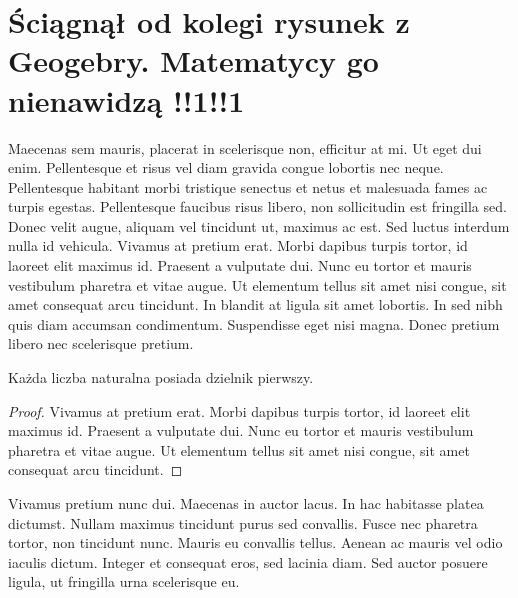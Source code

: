 \section{Ściągnął od kolegi rysunek z Geogebry. Matematycy go nienawidzą !!1!!1}
Maecenas sem mauris, placerat in scelerisque non, efficitur at mi. Ut eget dui enim. Pellentesque et risus vel diam gravida congue lobortis nec neque. Pellentesque habitant morbi tristique senectus et netus et malesuada fames ac turpis egestas. Pellentesque faucibus risus libero, non sollicitudin est fringilla sed. Donec velit augue, aliquam vel tincidunt ut, maximus ac est. Sed luctus interdum nulla id vehicula. Vivamus at pretium erat. Morbi dapibus turpis tortor, id laoreet elit maximus id. Praesent a vulputate dui. Nunc eu tortor et mauris vestibulum pharetra et vitae augue. Ut elementum tellus sit amet nisi congue, sit amet consequat arcu tincidunt. In blandit at ligula sit amet lobortis. In sed nibh quis diam accumsan condimentum. Suspendisse eget nisi magna. Donec pretium libero nec scelerisque pretium.
\begin{theorem}
    Każda liczba naturalna posiada dzielnik pierwszy.
\end{theorem}
\begin{proof}
    Vivamus at pretium erat. Morbi dapibus turpis tortor, id laoreet elit maximus id. Praesent a vulputate dui. Nunc eu tortor et mauris vestibulum pharetra et vitae augue. Ut elementum tellus sit amet nisi congue, sit amet consequat arcu tincidunt.
\end{proof}
\newpage
Vivamus pretium nunc dui. Maecenas in auctor lacus. In hac habitasse platea dictumst. Nullam maximus tincidunt purus sed convallis. Fusce nec pharetra tortor, non tincidunt nunc. Mauris eu convallis tellus. Aenean ac mauris vel odio iaculis dictum. Integer et consequat eros, sed lacinia diam. Sed auctor posuere ligula, ut fringilla urna scelerisque eu.
